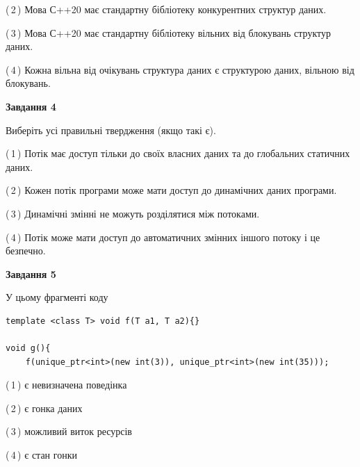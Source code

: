 \documentclass[12pt, ukrainian]{article}
\begin{document}
\begin {large}
{(\,2\,) Мова С++20 має стандартну бібліотеку конкурентних структур даних.%

(\,3\,) Мова С++20 має стандартну бібліотеку вільних від блокувань структур даних.%

(\,4\,) Кожна вільна від очікувань структура даних є структурою даних, вільною від блокувань.%



\begin{center}
\textbf{Завдання 4}
\end{center}
Виберіть усі правильні твердження (якщо такі є).\par
\vspace{2mm}

(\,1\,) Потік має доступ тільки до своїх власних даних та до глобальних статичних даних.%

(\,2\,) Кожен потік програми може мати доступ до динамічних даних програми.%

(\,3\,) Динамічні змінні не можуть розділятися між потоками.%

(\,4\,) Потік може мати доступ до автоматичних змінних іншого потоку і це безпечно.%



\begin{center}
\textbf{Завдання 5}
\end{center}
У цьому фрагменті коду
\begin{verbatim}
template <class T> void f(T a1, T a2){}

void g(){
    f(unique_ptr<int>(new int(3)), unique_ptr<int>(new int(35)));
\end{verbatim}

(\,1\,) є невизначена поведінка%

(\,2\,) є гонка даних%

(\,3\,) можливий виток ресурсів%

(\,4\,) є стан гонки%


}
\end {large}
\end{document}
